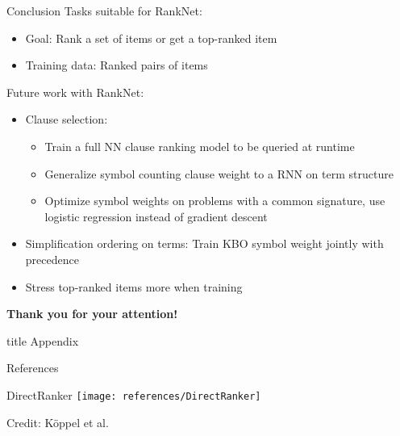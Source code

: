 \documentclass{ctuslides}
\newcommand{\source}[1]{\tiny Credit: #1}
\begin{document}
\begin{frame}{Conclusion}
Tasks suitable for RankNet:
\begin{itemize}
\item Goal: Rank a set of items or get a top-ranked item
\item Training data: Ranked pairs of items
\end{itemize}
\pause
Future work with RankNet:
\begin{itemize}
\item Clause selection:
\begin{itemize}
\item Train a full NN clause ranking model to be queried at runtime
\item Generalize symbol counting clause weight to a RNN on term structure
\item Optimize symbol weights on problems with a common signature,
use logistic regression instead of gradient descent
\end{itemize}
\item Simplification ordering on terms: Train KBO symbol weight jointly with precedence
\item Stress top-ranked items more when training
\end{itemize}
\pause
{}
\centering
\textbf{Thank you for your attention!}
\end{frame}

\appendix

\begin{frame}[plain]
\begin{beamercolorbox}[center]{title}
Appendix
\end{beamercolorbox}
\end{frame}

\begin{frame}[allowframebreaks]{References}

\tiny

\end{frame}

\begin{frame}{DirectRanker}
\centering
\texttt{[image: references/DirectRanker]}

\source{K{\"{o}}ppel et al. \cite{DBLP:conf/pkdd/KoppelSWPK019}}
\end{frame}
\end{document}
